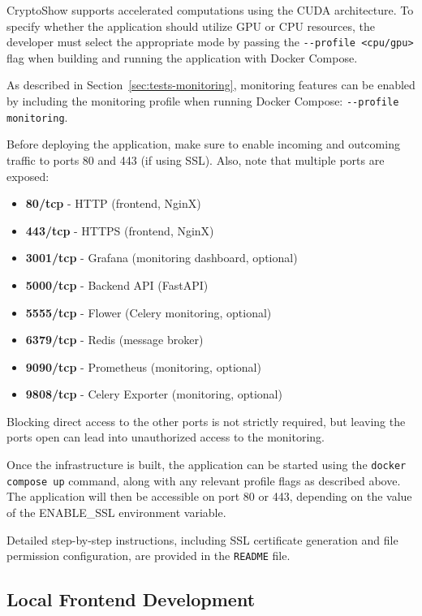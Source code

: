 CryptoShow supports accelerated computations using the CUDA architecture. To specify whether the application should utilize GPU or CPU resources, the developer must select the appropriate mode by passing the \lstinline|--profile <cpu/gpu>| flag when building and running the application with Docker Compose.

As described in Section~\ref{sec:tests-monitoring}, monitoring features can be enabled by including the monitoring profile when running Docker Compose: \lstinline|--profile monitoring|.

Before deploying the application, make sure to enable incoming and outcoming traffic to ports 80 and 443 (if using SSL). Also, note that multiple ports are exposed:

\begin{itemize}
    \item \textbf{80/tcp} - HTTP (frontend, NginX)
    \item \textbf{443/tcp} - HTTPS (frontend, NginX)
    \item \textbf{3001/tcp} - Grafana (monitoring dashboard, optional)
    \item \textbf{5000/tcp} - Backend API (FastAPI)
    \item \textbf{5555/tcp} - Flower (Celery monitoring, optional)
    \item \textbf{6379/tcp} - Redis (message broker)
    \item \textbf{9090/tcp} - Prometheus (monitoring, optional)
    \item \textbf{9808/tcp} - Celery Exporter (monitoring, optional)
\end{itemize}

Blocking direct access to the other ports is not strictly required, but leaving the ports open can lead into unauthorized access to the monitoring.

Once the infrastructure is built, the application can be started using the \lstinline|docker compose up| command, along with any relevant profile flags as described above. The application will then be accessible on port 80 or 443, depending on the value of the ENABLE\_SSL environment variable.

Detailed step-by-step instructions, including SSL certificate generation and file permission configuration, are provided in the \lstinline|README| file.

\subsection{Local Frontend Development}
\label{sec:local-frontend-development}

